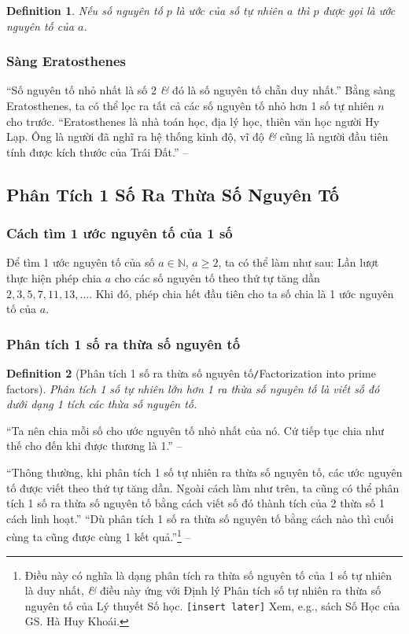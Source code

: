 \documentclass{article}
\numberwithin{equation}{section}
\newtheorem{definition}{Definition}[section]
\begin{document}
\begin{definition}
	Nếu số nguyên tố $p$ là ước của số tự nhiên $a$ thì $p$ được gọi là \emph{ước nguyên tố} của $a$.
\end{definition}

\subsubsection{Sàng Eratosthenes}
``Số nguyên tố nhỏ nhất là số 2 \textit{\&} đó là số nguyên tố chẵn duy nhất.'' Bằng sàng Eratosthenes, ta có thể lọc ra tất cả các số nguyên tố nhỏ hơn 1 số tự nhiên $n$ cho trước. ``Eratosthenes là nhà toán học, địa lý học, thiên văn học người Hy Lạp. Ông là người đã nghĩ ra hệ thống kinh độ, vĩ độ \textit{\&} cũng là người đầu tiên tính được kích thước của Trái Đất.'' -- \cite[p. 43]{Thai_Anh_Dat_Ha_Loan_Nam_Quang_Toan_6_tap_1}

\subsection{Phân Tích 1 Số Ra Thừa Số Nguyên Tố}

\subsubsection{Cách tìm 1 ước nguyên tố của 1 số}
\begin{tcolorbox}
	Để tìm 1 ước nguyên tố của số $a\in\mathbb{N}$, $a\ge 2$, ta có thể làm như sau: Lần lượt thực hiện phép chia $a$ cho các số nguyên tố theo thứ tự tăng dần $2,3,5,7,11,13,\ldots$. Khi đó, phép chia hết đầu tiên cho ta số chia là 1 ước nguyên tố của $a$.
\end{tcolorbox}

\subsubsection{Phân tích 1 số ra thừa số nguyên tố}

\begin{definition}[Phân tích 1 số ra thừa số nguyên tố\texttt{/}Factorization into prime factors]
	\emph{Phân tích 1 số tự nhiên lớn hơn 1 ra thừa số nguyên tố} là viết số đó dưới dạng 1 tích các thừa số nguyên tố.
\end{definition}
``Ta nên chia mỗi số cho ước nguyên tố nhỏ nhất của nó. Cứ tiếp tục chia như thế cho đến khi được thương là 1.'' -- \cite[p. 45]{Thai_Anh_Dat_Ha_Loan_Nam_Quang_Toan_6_tap_1}

``Thông thường, khi phân tích 1 số tự nhiên ra thừa số nguyên tố, các ước nguyên tố được viết theo thứ tự tăng dần. Ngoài cách làm như trên, ta cũng có thể phân tích 1 số ra thừa số nguyên tố bằng cách viết số đó thành tích của 2 thừa số 1 cách linh hoạt.'' ``Dù phân tích 1 số ra thừa số nguyên tố bằng cách nào thì cuối cùng ta cũng được cùng 1 kết quả.''\footnote{Điều này có nghĩa là dạng phân tích ra thừa số nguyên tố của 1 số tự nhiên là duy nhất, \textit{\&} điều này ứng với Định lý Phân tích số tự nhiên ra thừa số nguyên tố của Lý thuyết Số học. \texttt{[insert later]} Xem, e.g., sách Số Học của GS. Hà Huy Khoái.} -- \cite[p. 46]{Thai_Anh_Dat_Ha_Loan_Nam_Quang_Toan_6_tap_1}
\end{document}
